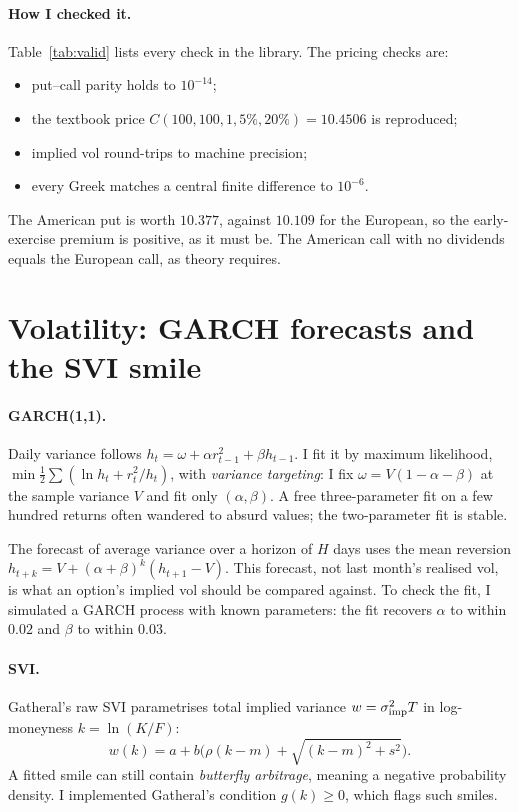\documentclass[11pt,a4paper]{article}
\begin{document}
\paragraph{How I checked it.} Table~\ref{tab:valid} lists every check in the library. The pricing checks are:
\begin{itemize}[leftmargin=1.5em]
  \item put--call parity holds to $10^{-14}$;
  \item the textbook price $C(100,100,1,5\%,20\%) = 10.4506$ is reproduced;
  \item implied vol round-trips to machine precision;
  \item every Greek matches a central finite difference to $10^{-6}$.
\end{itemize}
The American put is worth $10.377$, against $10.109$ for the European, so the early-exercise premium is positive, as it must be. The American call with no dividends equals the European call, as theory requires.

\section{Volatility: GARCH forecasts and the SVI smile}
\paragraph{GARCH(1,1).} Daily variance follows $h_t = \omega + \alpha r_{t-1}^2 + \beta h_{t-1}$. I fit it by maximum likelihood, $\min \frac12\sum(\ln h_t + r_t^2/h_t)$, with \emph{variance targeting}: I fix $\omega = V(1-\alpha-\beta)$ at the sample variance $V$ and fit only $(\alpha,\beta)$. A free three-parameter fit on a few hundred returns often wandered to absurd values; the two-parameter fit is stable.

The forecast of average variance over a horizon of $H$ days uses the mean reversion $h_{t+k} = V + (\alpha+\beta)^k(h_{t+1} - V)$. This forecast, not last month's realised vol, is what an option's implied vol should be compared against. To check the fit, I simulated a GARCH process with known parameters: the fit recovers $\alpha$ to within $0.02$ and $\beta$ to within $0.03$.

\paragraph{SVI.} Gatheral's raw SVI parametrises total implied variance $w = \sigma_{\rm imp}^2T$ in log-moneyness $k=\ln(K/F)$:
\begin{equation}
w(k) = a + b\big(\rho(k-m) + \sqrt{(k-m)^2+s^2}\big).
\end{equation}
A fitted smile can still contain \emph{butterfly arbitrage}, meaning a negative probability density. I implemented Gatheral's condition $g(k)\ge 0$, which flags such smiles.
\end{document}
